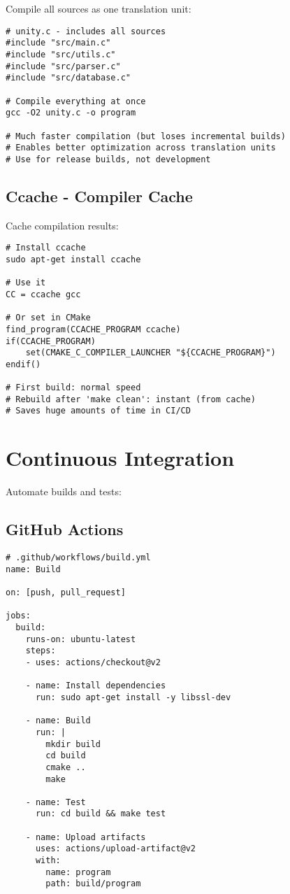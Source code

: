 Compile all sources as one translation unit:

\begin{lstlisting}
# unity.c - includes all sources
#include "src/main.c"
#include "src/utils.c"
#include "src/parser.c"
#include "src/database.c"

# Compile everything at once
gcc -O2 unity.c -o program

# Much faster compilation (but loses incremental builds)
# Enables better optimization across translation units
# Use for release builds, not development
\end{lstlisting}

\subsection{Ccache - Compiler Cache}

Cache compilation results:

\begin{lstlisting}
# Install ccache
sudo apt-get install ccache

# Use it
CC = ccache gcc

# Or set in CMake
find_program(CCACHE_PROGRAM ccache)
if(CCACHE_PROGRAM)
    set(CMAKE_C_COMPILER_LAUNCHER "${CCACHE_PROGRAM}")
endif()

# First build: normal speed
# Rebuild after 'make clean': instant (from cache)
# Saves huge amounts of time in CI/CD
\end{lstlisting}

\section{Continuous Integration}

Automate builds and tests:

\subsection{GitHub Actions}

\begin{lstlisting}
# .github/workflows/build.yml
name: Build

on: [push, pull_request]

jobs:
  build:
    runs-on: ubuntu-latest
    steps:
    - uses: actions/checkout@v2

    - name: Install dependencies
      run: sudo apt-get install -y libssl-dev

    - name: Build
      run: |
        mkdir build
        cd build
        cmake ..
        make

    - name: Test
      run: cd build && make test

    - name: Upload artifacts
      uses: actions/upload-artifact@v2
      with:
        name: program
        path: build/program
\end{lstlisting}

